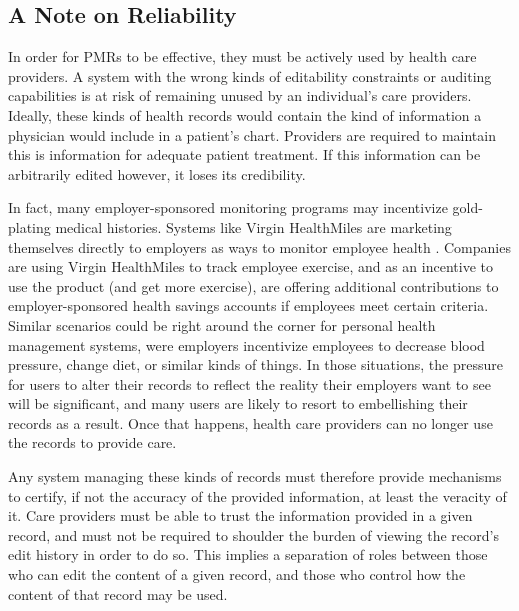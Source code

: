 \documentclass[10pt, conference, compsocconf]{IEEEtran}
\begin{document}
\subsection{A Note on Reliability}
In order for PMRs to be effective, they must be actively used by health care providers.  A system with the wrong kinds of editability constraints or auditing capabilities is at risk of remaining unused by an individual's care providers.  Ideally, these kinds of health records would contain the kind of information a physician would include in a patient's chart.  Providers are required to maintain this is information for adequate patient treatment.  If this information can be arbitrarily edited however, it loses its credibility.

In fact, many employer-sponsored monitoring programs may incentivize gold-plating medical histories.  Systems like Virgin HealthMiles are marketing themselves directly to employers as ways to monitor employee health \cite{Emr:Web:VirginHealthMiles}.  Companies are using Virgin HealthMiles to track employee exercise, and as an incentive to use the product (and get more exercise), are offering additional contributions to employer-sponsored health savings accounts if employees meet certain criteria.  Similar scenarios could be right around the corner for personal health management systems, were employers incentivize employees to decrease blood pressure, change diet, or similar kinds of things.  In those situations, the pressure for users to alter their records to reflect the reality their employers want to see will be significant, and many users are likely to resort to embellishing their records as a result. Once that happens, health care providers can no longer use the records to provide care.

Any system managing these kinds of records must therefore provide mechanisms to certify, if not the accuracy of the provided information, at least the veracity of it.  Care providers must be able to trust the information provided in a given record, and must not be required to shoulder the burden of viewing the record's edit history in order to do so.  This implies a separation of roles between those who can edit the content of a given record, and those who control how the content of that record may be used.
\end{document}
